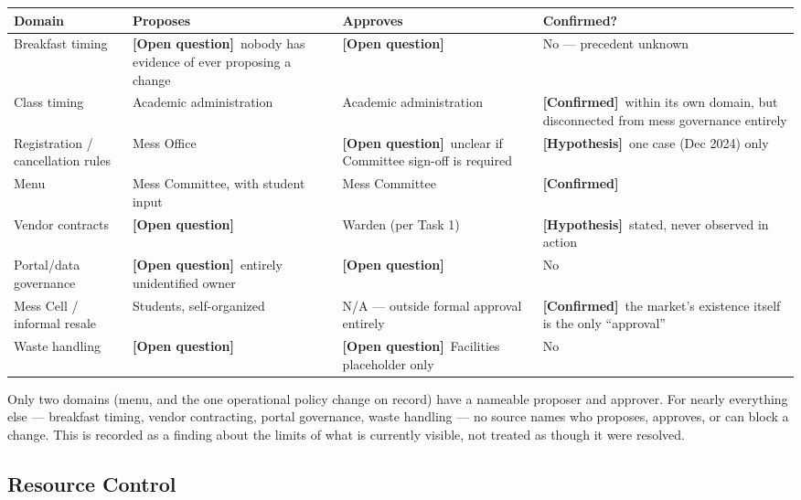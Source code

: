 \documentclass[11pt]{article}
\newcommand{\confirmed}{\textbf{[Confirmed]}}
\newcommand{\hypo}{\textbf{[Hypothesis]}}
\newcommand{\openq}{\textbf{[Open question]}}
\begin{document}
{\small\setlength{\tabcolsep}{4pt}
\begin{longtable}{L{0.18\textwidth}L{0.28\textwidth}L{0.28\textwidth}L{0.16\textwidth}}
\toprule
\textbf{Domain} & \textbf{Proposes} & \textbf{Approves} & \textbf{Confirmed?} \\
\midrule
\endhead
Breakfast timing & \openq\ nobody has evidence of ever proposing a change & \openq &
No --- precedent unknown \\[4pt]
Class timing & Academic administration & Academic administration & \confirmed\
within its own domain, but disconnected from mess governance entirely \\[4pt]
Registration / cancellation rules & Mess Office & \openq\ unclear if Committee
sign-off is required & \hypo\ one case (Dec 2024) only \\[4pt]
Menu & Mess Committee, with student input & Mess Committee & \confirmed \\[4pt]
Vendor contracts & \openq & Warden (per Task 1) & \hypo\ stated, never observed in
action \\[4pt]
Portal/data governance & \openq\ entirely unidentified owner & \openq & No \\[4pt]
Mess Cell / informal resale & Students, self-organized & N/A --- outside formal
approval entirely & \confirmed\ the market's existence itself is the only
``approval'' \\[4pt]
Waste handling & \openq & \openq\ Facilities placeholder only & No \\
\bottomrule
\end{longtable}}

Only two domains (menu, and the one operational policy change on record) have a
nameable proposer and approver. For nearly everything else --- breakfast timing,
vendor contracting, portal governance, waste handling --- no source names who
proposes, approves, or can block a change. This is recorded as a finding about the
limits of what is currently visible, not treated as though it were resolved.

\subsection{Resource Control}
\end{document}
